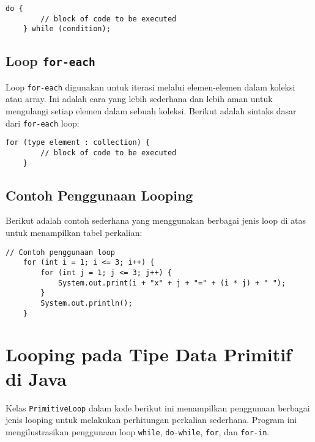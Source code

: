 \begin{lstlisting}[style=JavaStyle]
	do {
		// block of code to be executed
	} while (condition);
\end{lstlisting}

\subsection{Loop \texttt{for-each}}
Loop \texttt{for-each} digunakan untuk iterasi melalui elemen-elemen dalam koleksi atau array. Ini adalah cara yang lebih sederhana dan lebih aman untuk mengulangi setiap elemen dalam sebuah koleksi. Berikut adalah sintaks dasar dari \texttt{for-each} loop:

\begin{lstlisting}[style=JavaStyle]
	for (type element : collection) {
		// block of code to be executed
	}
\end{lstlisting}

\subsection{Contoh Penggunaan Looping}
Berikut adalah contoh sederhana yang menggunakan berbagai jenis loop di atas untuk menampilkan tabel perkalian:

\begin{lstlisting}[style=JavaStyle]
	// Contoh penggunaan loop
	for (int i = 1; i <= 3; i++) {
		for (int j = 1; j <= 3; j++) {
			System.out.print(i + "x" + j + "=" + (i * j) + " ");
		}
		System.out.println();
	}
\end{lstlisting}




\section{Looping pada Tipe Data Primitif di Java}

Kelas \texttt{PrimitiveLoop} dalam kode berikut ini menampilkan penggunaan berbagai jenis looping untuk melakukan perhitungan perkalian sederhana. Program ini mengilustrasikan penggunaan loop \texttt{while}, \texttt{do-while}, \texttt{for}, dan \texttt{for-in}.

